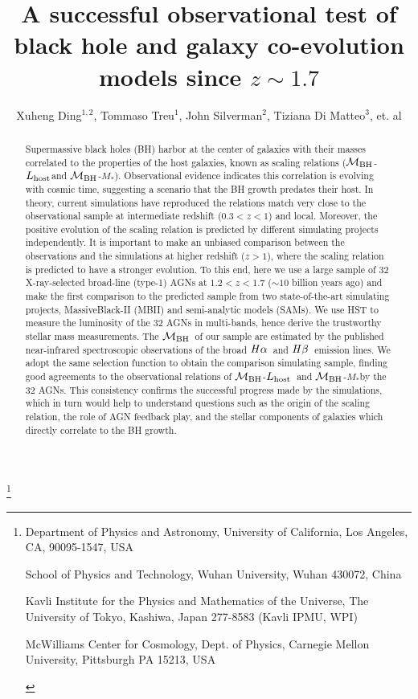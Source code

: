 \documentclass{natureprintstyle}
\title{
A successful observational test of black hole and galaxy co-evolution models since $z\sim1.7$
}
\author{Xuheng Ding$^{1,2}$, 
Tommaso Treu$^{1}$, 
John Silverman$^{2}$,
Tiziana Di Matteo$^{3}$,
et. al
}
\newcommand{\mbh}{$\mathcal M_{\rm BH}$}
\newcommand{\lhost}{$L_{\rm host}$}
\newcommand{\halpha}{${\it H}\alpha$}
\newcommand{\hbeta}{${\it H}\beta$}
\newcommand{\mstar}{{$M_*$}}
\begin{document}
\maketitle

\let\thefootnote\relax\footnote{
\begin{affiliations}
\item {Department of Physics and Astronomy, University of California, Los Angeles, CA, 90095-1547, USA} 
\item {School of Physics and Technology, Wuhan University, Wuhan 430072, China}
\item {Kavli Institute for the Physics and Mathematics of the Universe, The University of Tokyo, Kashiwa, Japan 277-8583 (Kavli IPMU, WPI)}
\item{McWilliams Center for Cosmology, Dept. of Physics, Carnegie Mellon University, Pittsburgh PA 15213, USA}
\end{affiliations}
}

\begin{abstract}
Supermassive black holes (BH) harbor at the center of galaxies with their masses correlated to the properties of the host galaxies, known as scaling relations (\mbh-\lhost and \mbh-\mstar). Observational evidence indicates this correlation is evolving with cosmic time, suggesting a scenario that the BH growth predates their host. In theory, current simulations have reproduced the relations match very close to the observational sample at intermediate redshift ($0.3<z<1$) and local. Moreover, the positive evolution of the scaling relation is predicted by different simulating projects independently. It is important to make an unbiased comparison between the observations and the simulations at higher redshift ($z>1$), where the scaling relation is predicted to have a stronger evolution. To this end, here we use a large sample of 32 X-ray-selected broad-line (type-1) AGNs at $1.2 < z < 1.7$ ($\sim10$ billion years ago) and make the first comparison to the predicted sample from two state-of-the-art simulating projects, MassiveBlack-II (MBII) and semi-analytic models (SAMs). We use HST to measure the luminosity of the 32 AGNs in multi-bands, hence derive the trustworthy stellar mass measurements. The \mbh\ of our sample are estimated by the published near-infrared spectroscopic observations of the broad \halpha\ and \hbeta\ emission lines. We adopt the same selection function to obtain the comparison simulating sample, finding good agreements to the observational relations of \mbh-\lhost\ and \mbh-\mstar by the 32 AGNs. This consistency confirms the successful progress made by the simulations, which in turn would help to understand questions such as the origin of the scaling relation, the role of AGN feedback play, and the stellar components of galaxies which directly correlate to the BH growth.
\end{abstract}
\end{document}
